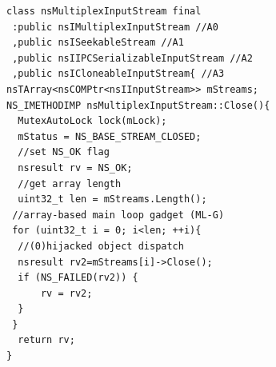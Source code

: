 
\newsavebox{\firstlisting}
\begin{lrbox}{\firstlisting}
\begin{minipage}[c]{\linewidth}
\begin{verbatim}
class nsMultiplexInputStream final 
 :public nsIMultiplexInputStream //A0
 ,public nsISeekableStream //A1
 ,public nsIIPCSerializableInputStream //A2
 ,public nsICloneableInputStream{ //A3
nsTArray<nsCOMPtr<nsIInputStream>> mStreams;
NS_IMETHODIMP nsMultiplexInputStream::Close(){
  MutexAutoLock lock(mLock);
  mStatus = NS_BASE_STREAM_CLOSED;
  //set NS_OK flag
  nsresult rv = NS_OK;
  //get array length
  uint32_t len = mStreams.Length();
 //array-based main loop gadget (ML-G)
 for (uint32_t i = 0; i<len; ++i){
  //(0)hijacked object dispatch
  nsresult rv2=mStreams[i]->Close();
  if (NS_FAILED(rv2)) {
      rv = rv2;
  }
 }
  return rv;
}
\end{verbatim}
\end{minipage}
\end{lrbox}

